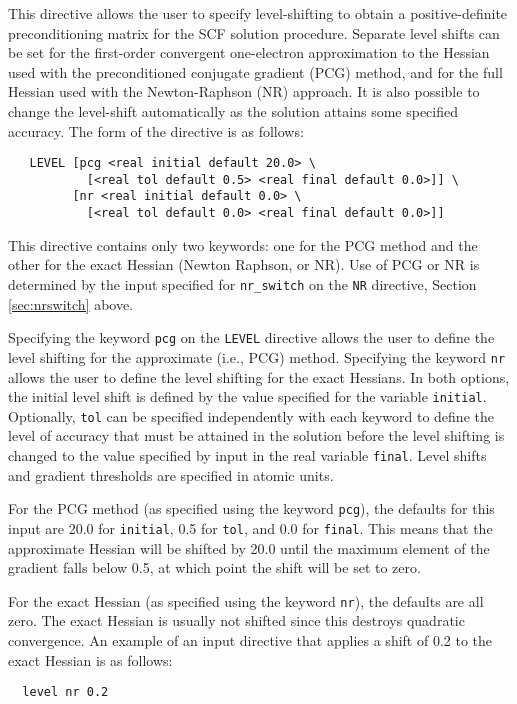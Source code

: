 This directive allows the user to specify level-shifting to obtain a
positive-definite preconditioning matrix for the SCF solution
procedure.  Separate level shifts can be set for the first-order
convergent one-electron approximation to the Hessian used with the
preconditioned conjugate gradient (PCG) method, and for the full
Hessian used with the Newton-Raphson (NR) approach.  It is also
possible to change the level-shift automatically as the solution
attains some specified accuracy.  The form of the directive is as
follows:
\begin{verbatim}
   LEVEL [pcg <real initial default 20.0> \
           [<real tol default 0.5> <real final default 0.0>]] \
         [nr <real initial default 0.0> \
           [<real tol default 0.0> <real final default 0.0>]]
\end{verbatim}

This directive contains only two keywords: one for the PCG method and
the other for the exact Hessian (Newton Raphson, or NR).  Use of PCG
or NR is determined by the input specified for \verb+nr_switch+ on the
\verb+NR+ directive, Section \ref{sec:nrswitch} above.  

Specifying the keyword \verb+pcg+ on the \verb+LEVEL+ directive allows
the user to define the level shifting for the approximate (i.e., PCG)
method.  Specifying the keyword \verb+nr+ allows the user to define
the level shifting for the exact Hessians.  In both options, the
initial level shift is defined by the value specified for the variable
\verb+initial+.  Optionally, \verb+tol+ can be specified independently
with each keyword to define the level of accuracy that must be
attained in the solution before the level shifting is changed to the
value specified by input in the real variable \verb+final+.  Level
shifts and gradient thresholds are specified in atomic units.

For the PCG method (as specified using the keyword \verb+pcg+), the
defaults for this input are 20.0 for \verb+initial+, 0.5 for
\verb+tol+, and 0.0 for \verb+final+.  This means that the
approximate Hessian will be shifted by 20.0 until the maximum element
of the gradient falls below 0.5, at which point the shift will be set
to zero.

For the exact Hessian (as specified using the keyword \verb+nr+), the
defaults are all zero.  The exact Hessian is usually not shifted since
this destroys quadratic convergence.  An example of an input directive
that applies a shift of 0.2 to the exact Hessian is as follows:
\begin{verbatim}
  level nr 0.2
\end{verbatim}

